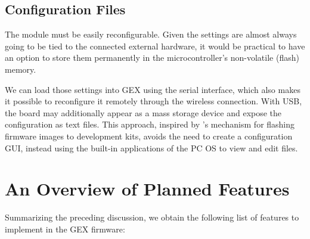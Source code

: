 \subsection{Configuration Files}

The module must be easily reconfigurable. Given the settings are almost always going to be tied to the connected external hardware, it would be practical to have an option to store them permanently in the microcontroller's non-volatile (flash) memory.

We can load those settings into GEX using the serial interface, which also makes it possible to reconfigure it remotely through the wireless connection. With USB, the board may additionally appear as a mass storage device and expose the configuration as text files. This approach, inspired by \mbed's mechanism for flashing firmware images to development kits, avoids the need to create a configuration \gls{GUI}, instead using the built-in applications of the \gls{PC} \gls{OS} to view and edit files.

\section{An Overview of Planned Features}

Summarizing the preceding discussion, we obtain the following list of features to implement in the GEX firmware:

